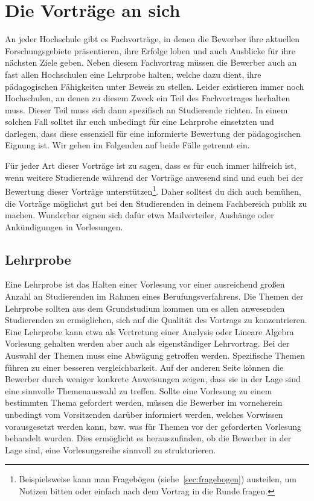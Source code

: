 \section{Die Vorträge an sich}
An jeder Hochschule gibt es Fachvorträge, in denen die Bewerber ihre aktuellen Forschungsgebiete präsentieren, ihre Erfolge loben und auch Ausblicke für ihre nächsten Ziele geben. Neben diesem Fachvortrag müssen die Bewerber auch an fast allen Hochschulen eine Lehrprobe halten, welche dazu dient, ihre pädagogischen Fähigkeiten unter Beweis zu stellen. Leider existieren immer noch Hochschulen, an denen zu diesem Zweck ein Teil des Fachvortrages herhalten muss. Dieser Teil muss sich dann spezifisch an Studierende richten. In einem solchen Fall solltet ihr euch unbedingt für eine Lehrprobe einsetzten und darlegen, dass diese essenziell für eine informierte Bewertung der pädagogischen Eignung ist. Wir gehen im Folgenden auf beide Fälle getrennt ein.

Für jeder Art dieser Vorträge ist zu sagen, dass es für euch immer hilfreich ist, wenn weitere Studierende während der Vorträge anwesend sind und euch bei der Bewertung dieser Vorträge unterstützen\footnote{Beispielsweise kann man Fragebögen (siehe~\ref{sec:fragebogen}) austeilen, um Notizen bitten oder einfach nach dem Vortrag in die Runde fragen.}. Daher solltest du dich auch bemühen, die Vorträge möglichst gut bei den Studierenden in deinem Fachbereich publik zu machen. Wunderbar eignen sich dafür etwa Mailverteiler, Aushänge oder Ankündigungen in Vorlesungen.

\subsection{Lehrprobe}
Eine Lehrprobe ist das Halten einer Vorlesung vor einer ausreichend großen Anzahl an Studierenden im Rahmen eines Berufungsverfahrens. Die Themen der Lehrprobe sollten aus dem Grundstudium kommen um es allen anwesenden Studierenden zu ermöglichen, sich auf die Qualität des Vortrags zu konzentrieren. Eine Lehrprobe kann etwa als Vertretung einer Analysis oder Lineare Algebra Vorlesung gehalten werden aber auch als eigenständiger Lehrvortrag. Bei der Auswahl der Themen muss eine Abwägung getroffen werden. Spezifische Themen führen zu einer besseren vergleichbarkeit. Auf der anderen Seite können die Bewerber durch weniger konkrete Anweisungen zeigen, dass sie in der Lage sind eine sinnvolle Themenauswahl zu treffen. Sollte eine Vorlesung zu einem bestimmten Thema gefordert werden, müssen die Bewerber im vorneherein unbedingt vom Vorsitzenden darüber informiert werden, welches Vorwissen vorausgesetzt werden kann, bzw. was für Themen vor der geforderten Vorlesung behandelt wurden. Dies ermöglicht es herauszufinden, ob die Bewerber in der Lage sind, eine Vorlesungsreihe sinnvoll zu strukturieren.

